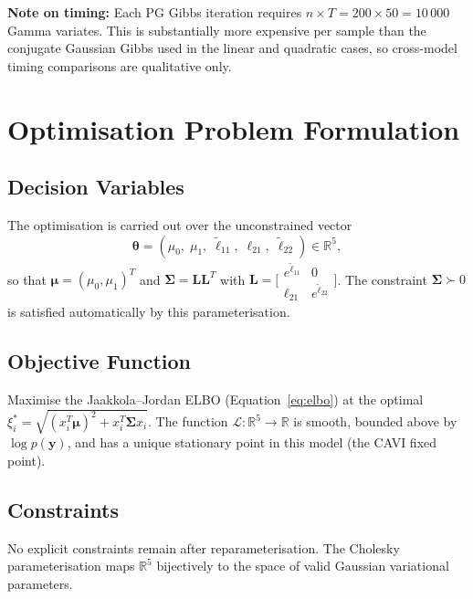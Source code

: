 \documentclass[11pt,a4paper]{article}
\newcommand{\R}{\mathbb{R}}
\begin{document}
\textbf{Note on timing:}
Each PG Gibbs iteration requires $n \times T = 200 \times 50 = 10\,000$ Gamma variates.
This is substantially more expensive per sample than the conjugate Gaussian Gibbs used in
the linear and quadratic cases, so cross-model timing comparisons are qualitative only.

\section{Optimisation Problem Formulation}

\subsection*{Decision Variables}

The optimisation is carried out over the unconstrained vector
\begin{equation}
  \bm{\theta} = (\mu_0,\; \mu_1,\; \tilde{\ell}_{11},\; \ell_{21},\; \tilde{\ell}_{22})
  \in \R^5,
\end{equation}
so that $\bm{\mu} = (\mu_0, \mu_1)^T$ and
$\bm{\Sigma} = \bm{L}\bm{L}^T$ with $\bm{L} = \bigl[\begin{smallmatrix}
e^{\tilde{\ell}_{11}} & 0 \\ \ell_{21} & e^{\tilde{\ell}_{22}} \end{smallmatrix}\bigr]$.
The constraint $\bm{\Sigma} \succ 0$ is satisfied automatically by this parameterisation.

\subsection*{Objective Function}

Maximise the Jaakkola--Jordan ELBO (Equation~\ref{eq:elbo}) at the optimal
$\xi_i^* = \sqrt{(x_i^T\bm{\mu})^2 + x_i^T\bm{\Sigma} x_i}$.
The function $\mathcal{L}: \R^5 \to \R$ is smooth, bounded above by $\log p(\bm{y})$,
and has a unique stationary point in this model (the CAVI fixed point).

\subsection*{Constraints}

No explicit constraints remain after reparameterisation.
The Cholesky parameterisation maps $\R^5$ bijectively to the space of
valid Gaussian variational parameters.
\end{document}
